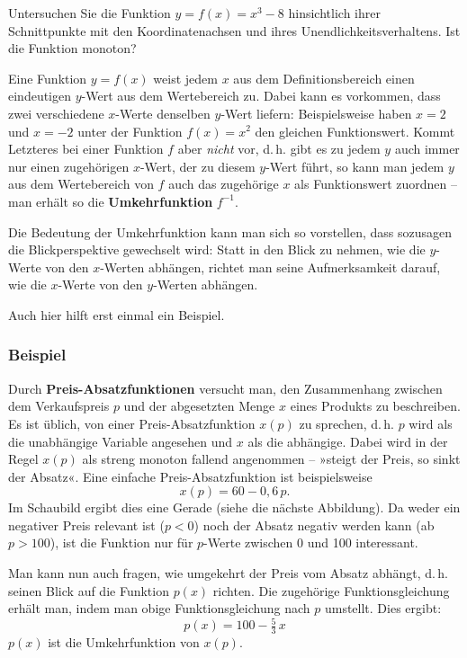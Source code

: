\begin{graukasten}
  Untersuchen Sie die Funktion $y = f(x) = x^3 - 8$ hinsichtlich ihrer Schnittpunkte mit den Koordinatenachsen und ihres Unendlichkeitsverhaltens. Ist die Funktion monoton?
\end{graukasten}


Eine Funktion $y = f(x)$ weist jedem $x$ aus dem Definitionsbereich einen eindeutigen $y$-Wert aus dem Wertebereich zu. Dabei kann es vorkommen, dass zwei verschiedene $x$-Werte denselben $y$-Wert liefern: Beispielsweise haben $x = 2$ und $x = -2$ unter der Funktion $f(x) = x^2$ den gleichen Funktionswert. Kommt Letzteres bei einer Funktion $f$ aber \emph{nicht} vor, d.\,h. gibt es zu jedem $y$ auch immer nur einen zugehörigen $x$-Wert, der zu diesem $y$-Wert führt, so kann man jedem $y$ aus dem Wertebereich von $f$ auch das zugehörige $x$ als Funktionswert zuordnen -- man erhält so die \textbf{Umkehrfunktion} $f^{-1}$.

Die Bedeutung der Umkehrfunktion kann man sich so vorstellen, dass sozusagen die Blickperspektive gewechselt wird: Statt in den Blick zu nehmen, wie die $y$-Werte von den $x$-Werten abhängen, richtet man seine Aufmerksamkeit darauf, wie die $x$-Werte von den $y$-Werten abhängen.

Auch hier hilft erst einmal ein Beispiel.

\subsubsection{Beispiel}

Durch \textbf{Preis-Absatzfunktionen} versucht man, den Zusammenhang zwischen dem Verkaufspreis $p$ und der abgesetzten Menge $x$ eines Produkts zu beschreiben. Es ist üblich, von einer Preis-Absatzfunktion $x(p)$ zu sprechen, d.\,h. $p$ wird als die unabhängige Variable angesehen und $x$ als die abhängige. Dabei wird in der Regel $x(p)$ als streng monoton fallend angenommen -- »steigt der Preis, so sinkt der Absatz«. Eine einfache Preis-Absatzfunktion ist beispielsweise
\[ x(p) = 60 - 0{,}6\,p . \]
Im Schaubild ergibt dies eine Gerade (siehe die nächste Abbildung). Da weder ein negativer Preis relevant ist ($p < 0$) noch der Absatz negativ werden kann (ab $p > 100$), ist die Funktion nur für $p$-Werte zwischen 0 und 100 interessant.

Man kann nun auch fragen, wie umgekehrt der Preis vom Absatz abhängt, d.\,h. seinen Blick auf die Funktion $p(x)$ richten. Die zugehörige Funktionsgleichung erhält man, indem man obige Funktionsgleichung nach $p$ umstellt. Dies ergibt:
\[ p(x) = 100 - \tfrac{5}{3}\,x \]
$p(x)$ ist die Umkehrfunktion von $x(p)$.

